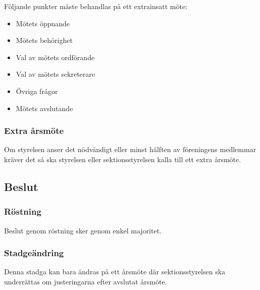 \documentclass[11pt, noincludeaddress]{classes/cthit}
\begin{document}
Följande punkter måste behandlas på ett extrainsatt möte:

\begin{itemize}
        \item Mötets öppnande
        \item Mötets behörighet
        \item Val av mötets ordförande
        \item Val av mötets sekreterare
        \item Övriga frågor
        \item Mötets avslutande
\end{itemize}

\subsubsection{Extra årsmöte}
Om styrelsen anser det nödvändigt eller minst hälften av föreningens medlemmar 
kräver det så ska styrelsen eller sektionsstyrelsen kalla till ett extra årsmöte.

\subsection{Beslut}

\subsubsection{Röstning}
Beslut genom röstning sker genom enkel majoritet.

\subsubsection{Stadgeändring}
Denna stadga kan bara ändras på ett årsmöte där sektionsstyrelsen ska underrättas om justeringarna efter avslutat årsmöte.
\end{document}
